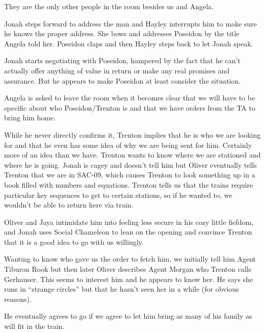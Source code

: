 They are the only other people in the room besides us and Angela.



Jonah steps forward to address the man and Hayley interrupts him to make sure he knows the proper address.  She bows and addresses Poseidon by the title Angela told her.  Poseidon claps and then Hayley steps back to let Jonah speak.



Jonah starts negotiating with Poseidon, hampered by the fact that he can't actually offer anything of value in return or make any real promises and assurance.  But he appears to make Poseidon at least consider the situation.  



Angela is asked to leave the room when it becomes clear that we will have to be specific about who Poseidon/Trenton is and that we have orders from the TA to bring him home.



While he never directly confirms it, Trenton implies that he is who we are looking for and that he even has some idea of why we are being sent for him.  Certainly more of an idea than we have.  Trenton wants to know where we are stationed and where he is going.  Jonah is cagey and doesn't tell him but Oliver eventually tells Trenton that we are in SAC-09, which causes Trenton to look something up in a book filled with numbers and equations.  Trenton tells us that the trains require particular key sequences to get to certain stations, so if he wanted to, we wouldn't be able to return here via train.



Oliver and Jaya intimidate him into feeling less secure in his cozy little fiefdom, and Jonah uses Social Chameleon to lean on the opening and convince Trenton that it is a good idea to go with us willingly.



Wanting to know who gave us the order to fetch him, we initially tell him Agent Tiburon Rook but then later Oliver describes Agent Morgan who Trenton calls Gerhauser.  This seems to interest him and he appears to know her.  He says she runs in ``strange circles'' but that he hasn't seen her in a while (for obvious reasons).



He eventually agrees to go if we agree to let him bring as many of his family as will fit in the train.



